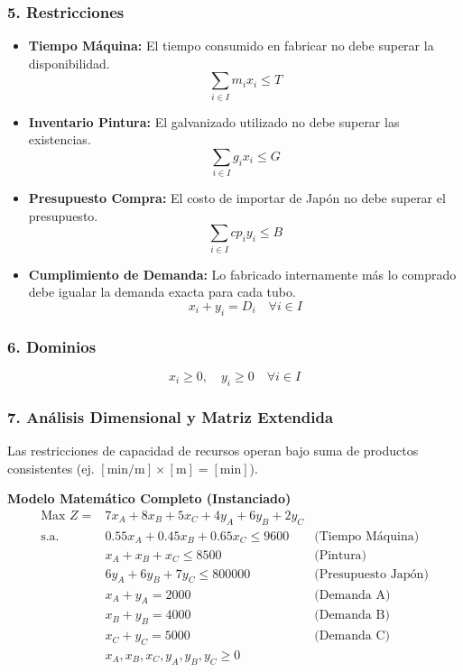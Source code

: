 \documentclass{article}
\begin{document}
	\subsubsection*{5. Restricciones}
	\begin{itemize}
		\item \textbf{Tiempo Máquina:} El tiempo consumido en fabricar no debe superar la disponibilidad.
		$$ \sum_{i \in I} m_i x_i \leq T $$
		
		\item \textbf{Inventario Pintura:} El galvanizado utilizado no debe superar las existencias.
		$$ \sum_{i \in I} g_i x_i \leq G $$
		
		\item \textbf{Presupuesto Compra:} El costo de importar de Japón no debe superar el presupuesto.
		$$ \sum_{i \in I} cp_i y_i \leq B $$
		
		\item \textbf{Cumplimiento de Demanda:} Lo fabricado internamente más lo comprado debe igualar la demanda exacta para cada tubo.
		$$ x_i + y_i = D_i \quad \forall i \in I $$
	\end{itemize}
	
	\subsubsection*{6. Dominios}
	$$ x_i \geq 0, \quad y_i \geq 0 \quad \forall i \in I $$
	
	\subsubsection*{7. Análisis Dimensional y Matriz Extendida}
	Las restricciones de capacidad de recursos operan bajo suma de productos consistentes (ej. $[\text{min/m}] \times [\text{m}] = [\text{min}]$). 
	
	\vspace{0.5cm}
	\begin{center}
		\textbf{Modelo Matemático Completo (Instanciado)}
		$$\begin{aligned}
			\text{Max } Z = & 7x_A + 8x_B + 5x_C + 4y_A + 6y_B + 2y_C \\
			\text{s.a.} \quad & 0.55x_A + 0.45x_B + 0.65x_C \leq 9600 & \text{(Tiempo Máquina)} \\
			& x_A + x_B + x_C \leq 8500 & \text{(Pintura)} \\
			& 6y_A + 6y_B + 7y_C \leq 800000 & \text{(Presupuesto Japón)} \\
			& x_A + y_A = 2000 & \text{(Demanda A)} \\
			& x_B + y_B = 4000 & \text{(Demanda B)} \\
			& x_C + y_C = 5000 & \text{(Demanda C)} \\
			& x_A, x_B, x_C, y_A, y_B, y_C \geq 0 &
		\end{aligned}$$
	\end{center}
	
\end{document}
